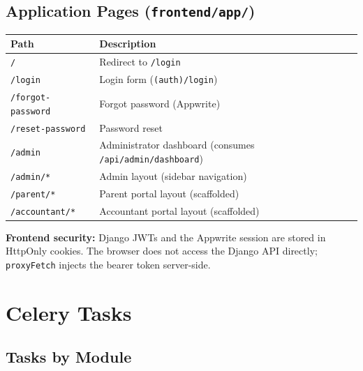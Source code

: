 \documentclass[11pt,a4paper]{article}
\begin{document}
\subsection{Application Pages (\texttt{frontend/app/})}

\begin{longtable}{@{}lp{8cm}@{}}
\toprule
\textbf{Path} & \textbf{Description} \\
\midrule
\endhead
\texttt{/} & Redirect to \texttt{/login} \\
\texttt{/login} & Login form (\texttt{(auth)/login}) \\
\texttt{/forgot-password} & Forgot password (Appwrite) \\
\texttt{/reset-password} & Password reset \\
\texttt{/admin} & Administrator dashboard (consumes \texttt{/api/admin/dashboard}) \\
\texttt{/admin/*} & Admin layout (sidebar navigation) \\
\texttt{/parent/*} & Parent portal layout (scaffolded) \\
\texttt{/accountant/*} & Accountant portal layout (scaffolded) \\
\bottomrule
\end{longtable}

\textbf{Frontend security:} Django JWTs and the Appwrite session are stored in HttpOnly cookies. The browser does not access the Django API directly; \texttt{proxyFetch} injects the bearer token server-side.

\section{Celery Tasks}

\subsection{Tasks by Module}
\end{document}
